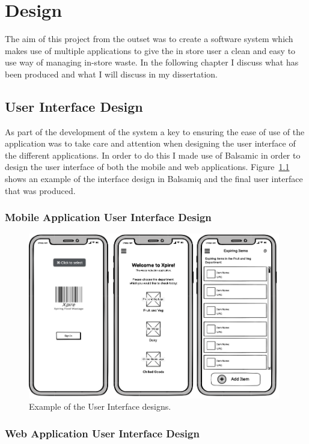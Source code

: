 \documentclass[a4paper,11pt]{report}
\begin{document}
\chapter{Design}
The aim of this project from the outset was to create a software system which makes use of multiple applications
 to give the in store user a clean and easy to use way of managing in-store waste. In the following chapter I 
 discuss what has been produced and what I will discuss in my dissertation.

\section{User Interface Design}

As part of the development of the system a key to ensuring the ease of use of the application was to take care and attention when
designing the user interface of the different applications. In order to do this I made use of Balsamic\cite{balsamiq} in order to design the user
interface of both the mobile and web applications. Figure~\ref{fig:UIDesignExample} shows an example of the 
interface design in Balsamiq and the final user interface that was produced. 

\subsection{Mobile Application User Interface Design}

\begin{figure}[H]
    \centering
    \includegraphics[width=11cm]{./assets/images/uiDesign-example.png}
    \caption{Example of the User Interface designs.}
    \label{fig:UIDesignExample}
\end{figure}


\subsection{Web Application User Interface Design}
\end{document}
